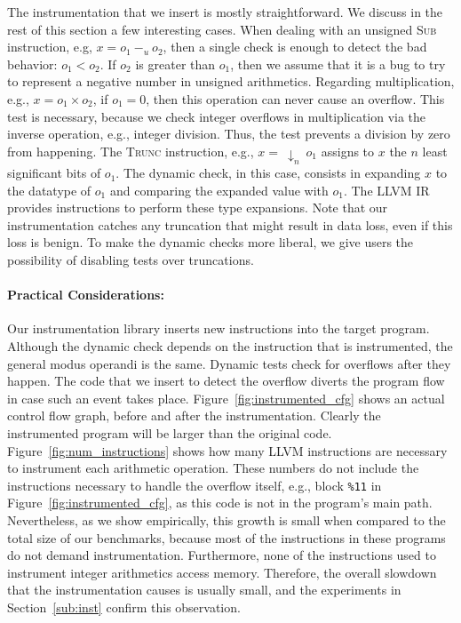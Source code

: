 \documentclass{sigplanconf}[10pt]
\begin{document}
The instrumentation that we insert is mostly straightforward.
We discuss in the rest of this section a few interesting cases.
When dealing with an unsigned \textsc{Sub} instruction, e.g,
$x = o_1 \ -_u \ o_2$, then a single check is enough to detect the bad
behavior: $o_1 < o_2$.
If $o_2$ is greater than $o_1$, then we assume that it is
a bug to try to represent a negative number in unsigned arithmetics.
Regarding multiplication, e.g., $x = o_1 \times o_2$, if $o_1 = 0$, then this
operation can never cause an overflow.
This test is necessary, because we check integer overflows in
multiplication via the inverse operation, e.g., integer division.
Thus, the test prevents a division by zero from happening.
The \textsc{Trunc} instruction, e.g., $x = \ \downarrow_n \ o_1$ assigns to $x$
the $n$ least significant bits of $o_1$.
The dynamic check, in this case, consists in expanding $x$ to
the datatype of $o_1$ and comparing the expanded value with $o_1$.
The LLVM IR provides instructions to perform these type expansions.
Note that our instrumentation catches any truncation that might result in
data loss, even if this loss is benign.
To make the dynamic checks more liberal, we give users the possibility of
disabling tests over truncations.

\paragraph{Practical Considerations: }
Our instrumentation library inserts new instructions into
the target program.
Although the dynamic check depends on the instruction that is instrumented,
the general modus operandi is the same.
Dynamic tests check for overflows after they happen.
The code that we insert to detect the overflow diverts the program flow in case
such an event takes place.
Figure~\ref{fig:instrumented_cfg} shows an actual control flow graph, before
and after the instrumentation.
Clearly the instrumented program will be larger than the original code.
Figure~\ref{fig:num_instructions} shows how many LLVM instructions are
necessary to instrument each arithmetic operation.
These numbers do not include the instructions necessary to handle the overflow
itself, e.g., block \texttt{\%11} in Figure~\ref{fig:instrumented_cfg}, as this
code is not in the program's main path.
Nevertheless, as we show empirically, this growth is small when
compared to the total size of our benchmarks, because most of the instructions
in these programs do not demand instrumentation.
Furthermore, none of the instructions used to instrument integer arithmetics
access memory.
Therefore, the overall slowdown that the instrumentation causes is usually
small, and the experiments in Section~\ref{sub:inst} confirm this
observation.
\end{document}
